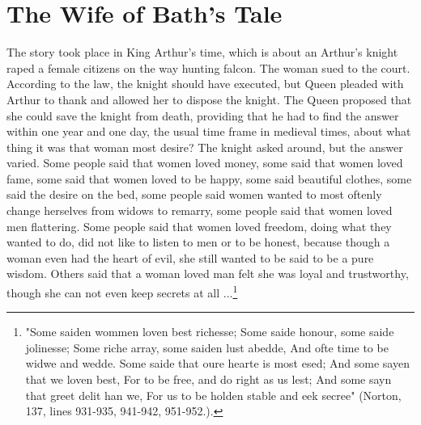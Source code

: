 \section{The Wife of Bath's Tale}
\label{tale}
The story took place in King Arthur's time, which is about an Arthur's knight raped a female citizens on the way hunting falcon. The woman sued to the court. According to the law, the knight should have executed, but Queen pleaded with Arthur to thank and allowed her to dispose the knight. The Queen proposed that she could save the knight from death, providing that he had to find the answer within one year and one day, the usual time frame in medieval times, about what thing it was that woman most desire? The knight asked around, but the answer varied. Some people said that women loved money, some said that women loved fame, some said that women loved to be happy, some said beautiful clothes, some  said the desire on the bed, some people said women wanted to most oftenly change herselves from widows to remarry, some people said that women loved men flattering. Some people said that women loved freedom, doing what they wanted to do, did not like to listen to men or to be honest, because though a woman even had the heart of evil, she still wanted to be said to be a pure wisdom. Others said that a woman loved man felt she was loyal and trustworthy, though she can not even keep secrets at all ...\footnote{"Some saiden wommen loven best richesse; Some saide honour, some saide jolinesse; Some riche array, some saiden lust abedde, And ofte time to be widwe and wedde. Some saide that oure hearte is most esed; And some sayen that we loven best, For to be free, and do right as us lest; And some sayn that greet delit han we, For us to be holden stable and eek secree" (Norton, 137, lines 931-935, 941-942, 951-952.).}

